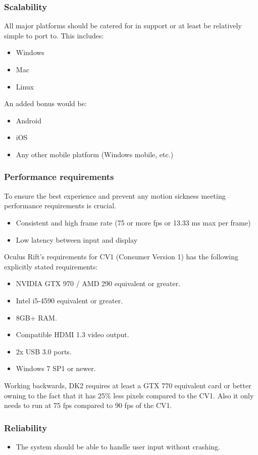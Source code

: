\documentclass[a4paper,12pt]{article}
\begin{document}
\subsubsection{Scalability}
All major platforms should be catered for in support or at least be relatively simple to port to. This includes:
	\begin{itemize}
		\item Windows
		\item Mac
		\item Linux		
	\end{itemize}
An added bonus would be:
	\begin{itemize}
		\item Android
		\item iOS
		\item Any other mobile platform (Windows mobile, etc.)
	\end{itemize}
	
\subsubsection{Performance requirements}
To ensure the best experience and prevent any motion sickness meeting performance requirements is crucial.
	\begin{itemize}
		\item Consistent and high frame rate (75 or more fps or 13.33 ms max per frame)
		\item Low latency between input and display
	\end{itemize}
Oculus Rift's requirements for CV1 (Consumer Version 1) has the following explicitly stated requirements:
\begin{itemize}
	\item NVIDIA GTX 970 / AMD 290 equivalent or greater.
	\item Intel i5-4590 equivalent or greater.
	\item 8GB+ RAM.
	\item Compatible HDMI 1.3 video output.
	\item 2x USB 3.0 ports.
	\item Windows 7 SP1 or newer.
\end{itemize}
Working backwards, DK2 requires at least a GTX 770 equivalent card or better owning to the fact that it has 25\% less pixels compared to the CV1. Also it only needs to run at 75 fps compared to 90 fps of the CV1.
\subsubsection{Reliability}
	\begin{itemize}
		\item The system should be able to handle user input without crashing.
	\end{itemize}
\end{document}
